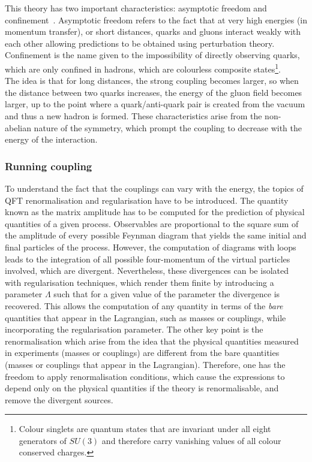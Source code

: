 This theory has two important characteristics: asymptotic freedom and confinement~\cite{PhysRevLett.30.1346,PhysRevLett.30.1343}. Asymptotic freedom refers to the fact that at very high energies (in momentum transfer), or short distances, quarks and gluons interact weakly with each other allowing predictions to be obtained using perturbation theory. Confinement is the name given to the impossibility of directly observing quarks, which are only confined in hadrons, which are colourless composite states\footnote{Colour singlets are quantum states that are invariant under all eight generators of $SU(3)$ and therefore carry vanishing values of all colour conserved charges.}.\\

The idea is that for long distances, the strong coupling becomes larger, so when the distance between two quarks increases, the energy of the gluon field becomes larger, up to the point where a quark/anti-quark pair is created from the vacuum and thus a new hadron is formed. These characteristics arise from the non-abelian nature of the symmetry, which prompt the coupling to decrease with the energy of the interaction.

\subsubsection{Running coupling}

To understand the fact that the couplings can vary with the energy, the topics of \acrshort{QFT} renormalisation and regularisation have to be introduced. The quantity known as the matrix amplitude has to be computed for the prediction of physical quantities of a given process. Observables are proportional to the square sum of the amplitude of every possible Feynman diagram that yields the same initial and final particles of the process. However, the computation of diagrams with loops leads to the integration of all possible four-momentum of the virtual particles involved, which are divergent. Nevertheless, these divergences can be isolated with regularisation techniques, which render them finite by introducing a parameter $\Lambda$ such that for a given value of the parameter the divergence is recovered. This allows the computation of any quantity in terms of the \textit{bare} quantities that appear in the Lagrangian, such as masses or couplings, while incorporating the regularisation parameter. The other key point is the renormalisation which arise from the idea that the physical quantities measured in experiments (masses or couplings) are different from the bare quantities (masses or couplings that appear in the Lagrangian). Therefore, one has the freedom to apply renormalisation conditions, which cause the expressions to depend only on the physical quantities if the theory is renormalisable, and remove the divergent sources.\\

